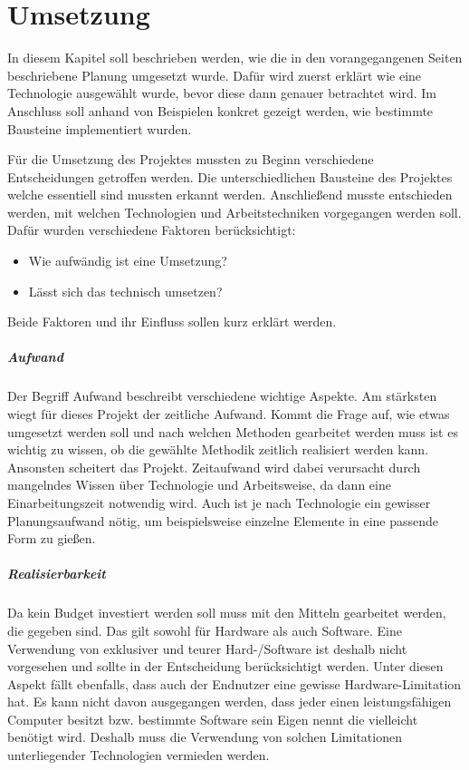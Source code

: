 \chapter{Umsetzung}
\label{umsetzungchapter}

In diesem Kapitel soll beschrieben werden, wie die in den vorangegangenen Seiten beschriebene Planung umgesetzt wurde. Dafür wird zuerst erklärt wie eine Technologie ausgewählt wurde, bevor diese dann genauer betrachtet wird. Im Anschluss soll anhand von Beispielen konkret gezeigt werden, wie bestimmte Bausteine implementiert wurden.

Für die Umsetzung des Projektes mussten zu Beginn verschiedene Entscheidungen getroffen werden. Die unterschiedlichen Bausteine des Projektes welche essentiell sind mussten erkannt werden. Anschließend musste entschieden werden, mit welchen Technologien und Arbeitstechniken vorgegangen werden soll. Dafür wurden verschiedene Faktoren berücksichtigt:

\begin{itemize}
\item Wie aufwändig ist eine Umsetzung?
\item Lässt sich das technisch umsetzen?
\end{itemize}

Beide Faktoren und ihr Einfluss sollen kurz erklärt werden.

\paragraph{Aufwand} Der Begriff Aufwand beschreibt verschiedene wichtige Aspekte. Am stärksten wiegt für dieses Projekt der zeitliche Aufwand. Kommt die Frage auf, wie etwas umgesetzt werden soll und nach welchen Methoden gearbeitet werden muss ist es wichtig zu wissen, ob die gewählte Methodik zeitlich realisiert werden kann. Ansonsten scheitert das Projekt. Zeitaufwand wird dabei verursacht durch mangelndes Wissen über Technologie und Arbeitsweise, da dann eine Einarbeitungszeit notwendig wird. Auch ist je nach Technologie ein gewisser Planungsaufwand nötig, um beispielsweise einzelne Elemente in eine passende Form zu gießen.

\newpage

\paragraph{Realisierbarkeit} Da kein Budget investiert werden soll muss mit den Mitteln gearbeitet werden, die gegeben sind. Das gilt sowohl für Hardware als auch Software. Eine Verwendung von exklusiver und teurer Hard-/Software ist deshalb nicht vorgesehen und sollte in der Entscheidung berücksichtigt werden. Unter diesen Aspekt fällt ebenfalls, dass auch der Endnutzer eine gewisse Hardware-Limitation hat. Es kann nicht davon ausgegangen werden, dass jeder einen leistungsfähigen Computer besitzt bzw. bestimmte Software sein Eigen nennt die vielleicht benötigt wird. Deshalb muss die Verwendung von solchen Limitationen unterliegender Technologien vermieden werden.

